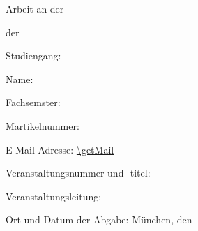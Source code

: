 \begin{titlepage}
    \begin{center}
        \vspace*{3cm}
          
        \Huge
        \getTitle
            
        \vspace{1cm}

			\small
			Arbeit an der \getFaculty

			der \getUniversity

			Studiengang: \getProgram

			\getSemester
            
        \vspace{1.5cm}
        \Large
        \end{center}
            
        \vfill
        
        	Name: \getAuthor
        
			Fachsemster: \getSubjectSemester

			Martikelnummer: \getMatriculationNumber

			E-Mail-Adresse: \url{\getMail}

			Veranstaltungsnummer und -titel: \getCourse

			Veranstaltungsleitung: \getLecturer

			Ort und Datum der Abgabe: München, den \getSubmissionDate
            
        \vspace{1cm}
            
\end{titlepage}